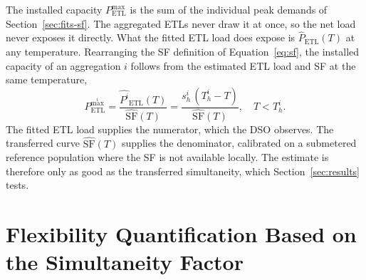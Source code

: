 \documentclass[9pt,journal,a4]{IEEEtran}
\begin{document}
The installed capacity $P_{\mathrm{ETL}}^{\max}$ is the sum of the individual peak demands of Section~\ref{sec:fits-sf}. The aggregated ETLs never draw it at once, so the net load never exposes it directly. What the fitted ETL load does expose is $\hat{P}_{\mathrm{ETL}}(T)$ at any temperature. Rearranging the SF definition of Equation~\eqref{eq:sf}, the installed capacity of an aggregation $i$ follows from the estimated ETL load and SF at the same temperature,
\begin{equation}
	P_{\mathrm{ETL}}^{\max^i} = \frac{\hat{P^i}_{\mathrm{ETL}}(T)}{\hat{\mathrm{SF}}(T)} =  \frac{s^i_h \, (T^i_h - T)}{\hat{\mathrm{SF}}(T)}, \quad T < T^i_h.
	\label{eq:capacity}
\end{equation}
The fitted ETL load supplies the numerator, which the DSO observes. The transferred curve $\hat{\mathrm{SF}}(T)$ supplies the denominator, calibrated on a submetered reference population where the SF is not available locally. The estimate is therefore only as good as the transferred simultaneity, which Section~\ref{sec:results} tests.


\section{Flexibility Quantification Based on the Simultaneity Factor}
\label{sec:uc-flex}
\label{sec:flex}
\end{document}
